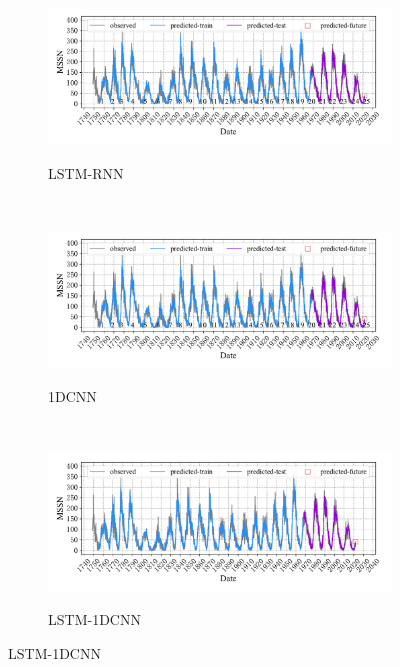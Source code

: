 \begin{figure}[!htbp]
  \centering
  \begin{subfigure}[b]{1.0\textwidth}
    \caption{LSTM-RNN} 
    \vspace{-0.35cm}
    \includegraphics[width=\textwidth]{Img/chap3_ss/ssn_series_in_72_out_1_layer_3_layersize_64_lstm.pdf}
    \label{fig:ssn_series_in_72_out_1_lstm}
  \end{subfigure}    \\
  \vspace{-1cm}
  \begin{subfigure}[b]{1.0\textwidth}
    \caption{1DCNN}
    \vspace{-0.35cm}
    \includegraphics[width=\textwidth]{Img/chap3_ss/ssn_series_in_72_out_1_layer_3_layersize_64_lstm_cnn.pdf}
    \label{fig:ssn_series_in_72_out_1_cnn}
  \end{subfigure} \\
  \vspace{-1cm}
  \begin{subfigure}[b]{1.0\textwidth}
    \caption{LSTM-1DCNN}
    \vspace{-0.35cm}
    \includegraphics[width=\textwidth]{Img/chap3_ss/ssn_series_in_72_out_1_lstm_cnn.pdf}
    \label{fig:ssn_series_in_72_out_1_lstm_cnn}
    \end{subfigure}
  \vspace{-2cm}
  \label{fig:ssn_series_in_72_out_1}
\end{figure}

